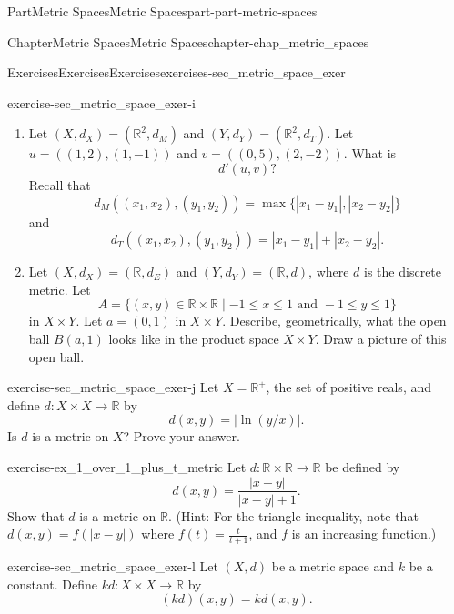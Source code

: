 \documentclass[oneside,10pt,]{book}
\numberwithin{equation}{chapter}
\newcommand{\R}{\mathbb{R}}
\begin{document}
\begin{partptx}{Part}{Metric Spaces}{}{Metric Spaces}{}{}{part-part-metric-spaces}
\begin{chapterptx}{Chapter}{Metric Spaces}{}{Metric Spaces}{}{}{chapter-chap_metric_spaces}
\begin{exercises-section}{Exercises}{Exercises}{}{Exercises}{}{}{exercises-sec_metric_space_exer}
\begin{divisionexercise}{9}{}{}{exercise-sec_metric_space_exer-i}
\begin{enumerate}[font=\bfseries,label=(\alph*),ref=\alph*]
\item{}Let \((X, d_X) = (\R^2, d_M)\) and \((Y, d_Y) = (\R^2, d_T)\). Let \(u = ((1,2), (1,-1))\) and \(v = ((0,5),(2,-2))\). What is%
\begin{equation*}
d'(u,v)?
\end{equation*}
Recall that%
\begin{equation*}
d_M((x_1,x_2),(y_1,y_2)) = \max\{ | x_1-y_1 |, | x_2-y_2 |\}
\end{equation*}
and%
\begin{equation*}
d_T((x_1,x_2),(y_1,y_2)) = | x_1-y_1 | + | x_2-y_2 |\text{.}
\end{equation*}
%
\item{}Let \((X, d_X) = (\R, d_E)\) and \((Y, d_Y) = (\R, d)\), where \(d\) is the discrete metric. Let%
\begin{equation*}
A=\{(x,y) \in \R \times \R \mid -1\leq x \leq 1 \text{ and }  -1 \leq y \leq 1\}
\end{equation*}
in \(X \times Y\). Let \(a = (0,1)\) in \(X \times Y\). Describe, geometrically, what the open ball \(B(a,1)\) looks like in the product space \(X \times Y\). Draw a picture of this open ball.%
\end{enumerate}%
\end{divisionexercise}%
\begin{divisionexercise}{10}{}{}{exercise-sec_metric_space_exer-j}%
Let \(X = \R^+\), the set of positive reals, and define \(d: X \times X \to \R\) by%
\begin{equation*}
d(x,y) = |\ln(y/x)|\text{.}
\end{equation*}
Is \(d\) is a metric on \(X\)? Prove your answer.%
\end{divisionexercise}%
\begin{divisionexercise}{11}{}{}{exercise-ex_1_over_1_plus_t_metric}%
Let \(d: \R \times \R \to \R\) be defined by%
\begin{equation*}
d(x,y) = \frac{|x-y|}{|x-y|+1}\text{.}
\end{equation*}
Show that \(d\) is a metric on \(\R\). (Hint: For the triangle inequality, note that \(d(x,y) = f(|x-y|)\) where \(f(t) = \frac{t}{t+1}\), and \(f\) is an increasing function.)%
\end{divisionexercise}%
\begin{divisionexercise}{12}{}{}{exercise-sec_metric_space_exer-l}%
Let \((X,d)\) be a metric space and \(k\) be a constant. Define \(kd: X \times X \to \R\) by%
\begin{equation*}
(kd)(x,y) = kd(x,y)\text{.}

\end{equation*}
\end{divisionexercise}
\end{exercises-section}
\end{chapterptx}
\end{partptx}
\end{document}
